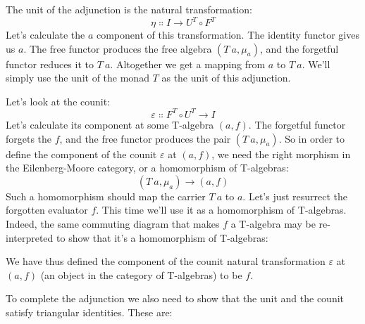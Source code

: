 The unit of the adjunction is the natural transformation:
\[\eta \Colon I \to U^T \circ F^T\]
Let's calculate the $a$ component of this transformation. The
identity functor gives us $a$. The free functor produces the free
algebra $(T\ a, \mu_a)$, and the forgetful functor reduces it to
$T\ a$. Altogether we get a mapping from $a$ to
$T\ a$. We'll simply use the unit of the monad $T$ as the
unit of this adjunction.

Let's look at the counit:
\[\varepsilon \Colon F^T \circ U^T \to I\]
Let's calculate its component at some T-algebra $(a, f)$. The
forgetful functor forgets the $f$, and the free functor produces
the pair $(T\ a, \mu_a)$. So in order to define the component of
the counit $\varepsilon$ at $(a, f)$, we need the right morphism in
the Eilenberg-Moore category, or a homomorphism of T-algebras:
\[(T\ a, \mu_a) \to (a, f)\]
Such a homomorphism should map the carrier $T\ a$ to $a$.
Let's just resurrect the forgotten evaluator $f$. This time we'll
use it as a homomorphism of T-algebras. Indeed, the same commuting
diagram that makes $f$ a T-algebra may be re-interpreted to show
that it's a homomorphism of T-algebras:

\begin{figure}[H]
\centering
{}
\end{figure}

\noindent
We have thus defined the component of the counit natural transformation
$\varepsilon$ at $(a, f)$ (an object in the category of T-algebras)
to be $f$.

To complete the adjunction we also need to show that the unit and the
counit satisfy triangular identities. These are:

\begin{figure}[H]
  \centering
  \begin{subfigure}
    \centering
  \end{subfigure}%
  \hspace{1cm}
  \begin{subfigure}
    \centering
  \end{subfigure}
\end{figure}

